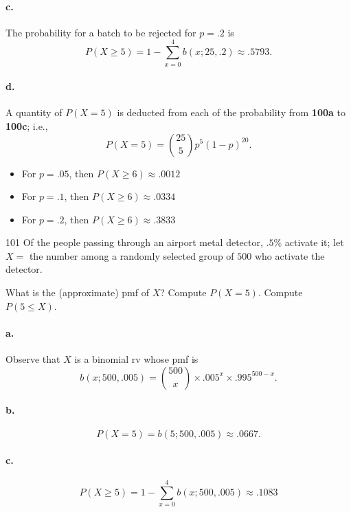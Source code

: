 \documentclass{exam}
\begin{document}
\paragraph{c.} The probability for a batch to be rejected for $p = .2$ is
\[	
	P(X \ge 5) = 1 - \sum_{x = 0}^4 b(x; 25, .2) \approx .5793.
\]

\paragraph{d.} A quantity of $P(X = 5)$ is deducted from each of the probability from \textbf{100a} to \textbf{100c}; i.e.,
\[
	P(X = 5) = \binom{25}5p^5(1 - p)^{20}.
\]
\begin{itemize}
	\item For $p = .05$, then $P(X \ge 6) \approx .0012$
	\item For $p = .1$, then $P(X \ge 6) \approx .0334$
	\item For $p = .2$, then $P(X \ge 6) \approx .3833$
\end{itemize}

\begin{problem}{101}
	Of the people passing through an airport metal detector, $.5\%$ activate it; let $X =$ the number among a randomly selected group of $500$ who activate the detector.
	\begin{tasks}[label=\textbf{\alph*.}]
		\task What is the (approximate) pmf of $X$?
		\task Compute $P(X = 5)$.
		\task Compute $P(5 \le X)$.
	\end{tasks}
\end{problem}

\paragraph{a.} Observe that $X$ is a binomial rv whose pmf is
\[
	b(x; 500, .005) = \binom{500}{x} \times .005^x \times .995^{500 - x}.
\]

\paragraph{b.}
\[
	P(X = 5) = b(5; 500, .005) \approx .0667.
\]

\paragraph{c.}
\[
	P(X \ge 5) = 1 - \sum_{x = 0}^4 b(x; 500, .005) \approx .1083
\]
\end{document}
